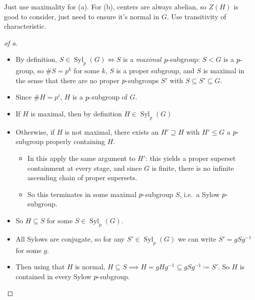 \begin{strategy}

Just use maximality for (a). For (b), centers are always abelian, so
\(Z(H)\) is good to consider, just need to ensure it's normal in \(G\).
Use transitivity of characteristic.

\end{strategy}

\begin{solution}

\envlist

\begin{proof}[of a]

\envlist

\begin{itemize}
\tightlist
\item
  By definition, \(S\in {\operatorname{Syl}}_p(G) \iff S\) is a
  \emph{maximal} \(p{\hbox{-}}\)subgroup: \(S<G\) is a
  \(p{\hbox{-}}\)group, so \(\#S = p^k\) for some \(k\), \(S\) is a
  proper subgroup, and \(S\) is maximal in the sense that there are no
  proper \(p{\hbox{-}}\)subgroups \(S'\) with
  \(S \subseteq S' \subseteq G\).
\item
  Since \(\# H = p^i\), \(H\) is a \(p{\hbox{-}}\)subgroup of \(G\).
\item
  If \(H\) is maximal, then by definition
  \(H\in {\operatorname{Syl}}_p(G)\)
\item
  Otherwise, if \(H\) is not maximal, there exists an \(H' \supseteq H\)
  with \(H'\leq G\) a \(p{\hbox{-}}\)subgroup properly containing \(H\).

  \begin{itemize}
  \tightlist
  \item
    In this apply the same argument to \(H'\): this yields a proper
    superset containment at every stage, and since \(G\) is finite,
    there is no infinite ascending chain of proper supersets.
  \item
    So this terminates in some maximal \(p{\hbox{-}}\)subgroup \(S\),
    i.e.~a Sylow \(p{\hbox{-}}\)subgroup.
  \end{itemize}
\item
  So \(H \subseteq S\) for some \(S\in {\operatorname{Syl}}_p(G)\).
\item
  All Sylows are conjugate, so for any
  \(S' \in {\operatorname{Syl}}_p(G)\) we can write \(S' = gSg^{-1}\)
  for some \(g\).
\item
  Then using that \(H\) is normal,
  \(H \subseteq S \implies H = gHg^{-1}\subseteq gSg^{-1}\coloneqq S'\).
  So \(H\) is contained in every Sylow \(p{\hbox{-}}\)subgroup.
\end{itemize}


\end{proof}
\end{solution}
